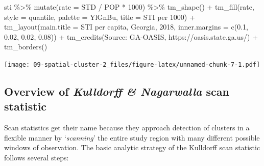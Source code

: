 \documentclass[
]{book}
\newenvironment{Shaded}{\begin{snugshade}}{\end{snugshade}}
\newcommand{\AttributeTok}[1]{\textcolor[rgb]{0.77,0.63,0.00}{#1}}
\newcommand{\DecValTok}[1]{\textcolor[rgb]{0.00,0.00,0.81}{#1}}
\newcommand{\FloatTok}[1]{\textcolor[rgb]{0.00,0.00,0.81}{#1}}
\newcommand{\FunctionTok}[1]{\textcolor[rgb]{0.00,0.00,0.00}{#1}}
\newcommand{\NormalTok}[1]{#1}
\newcommand{\SpecialCharTok}[1]{\textcolor[rgb]{0.00,0.00,0.00}{#1}}
\newcommand{\StringTok}[1]{\textcolor[rgb]{0.31,0.60,0.02}{#1}}
\begin{document}
\begin{Shaded}
\begin{Highlighting}[]
\NormalTok{sti }\SpecialCharTok{\%\textgreater{}\%}
  \FunctionTok{mutate}\NormalTok{(}\AttributeTok{rate =}\NormalTok{ STD }\SpecialCharTok{/}\NormalTok{ POP }\SpecialCharTok{*} \DecValTok{1000}\NormalTok{) }\SpecialCharTok{\%\textgreater{}\%}
  \FunctionTok{tm\_shape}\NormalTok{() }\SpecialCharTok{+} 
  \FunctionTok{tm\_fill}\NormalTok{(}\StringTok{\textquotesingle{}rate\textquotesingle{}}\NormalTok{,}
          \AttributeTok{style =} \StringTok{\textquotesingle{}quantile\textquotesingle{}}\NormalTok{,}
          \AttributeTok{palette =} \StringTok{\textquotesingle{}YlGnBu\textquotesingle{}}\NormalTok{,}
          \AttributeTok{title =} \StringTok{\textquotesingle{}STI per 1000\textquotesingle{}}\NormalTok{) }\SpecialCharTok{+}
  \FunctionTok{tm\_layout}\NormalTok{(}\AttributeTok{main.title =} \StringTok{\textquotesingle{}STI per capita, Georgia, 2018\textquotesingle{}}\NormalTok{,}
            \AttributeTok{inner.margins =} \FunctionTok{c}\NormalTok{(}\FloatTok{0.1}\NormalTok{, }\FloatTok{0.02}\NormalTok{, }\FloatTok{0.02}\NormalTok{, }\FloatTok{0.08}\NormalTok{)) }\SpecialCharTok{+}
  \FunctionTok{tm\_credits}\NormalTok{(}\StringTok{\textquotesingle{}Source: GA{-}OASIS, https://oasis.state.ga.us/\textquotesingle{}}\NormalTok{) }\SpecialCharTok{+}
  \FunctionTok{tm\_borders}\NormalTok{()}
\end{Highlighting}
\end{Shaded}

\texttt{[image: 09-spatial-cluster-2\_files/figure-latex/unnamed-chunk-7-1.pdf]}

\hypertarget{overview-of-kulldorff-nagarwalla-scan-statistic}{%
\subsection{\texorpdfstring{Overview of \emph{Kulldorff \& Nagarwalla} scan statistic}{Overview of Kulldorff \& Nagarwalla scan statistic}}\label{overview-of-kulldorff-nagarwalla-scan-statistic}}

Scan statistics get their name because they approach detection of clusters in a flexible manner by `\emph{scanning}' the entire study region with many different possible windows of observation. The basic analytic strategy of the Kulldorff scan statistic follows several steps:
\end{document}
